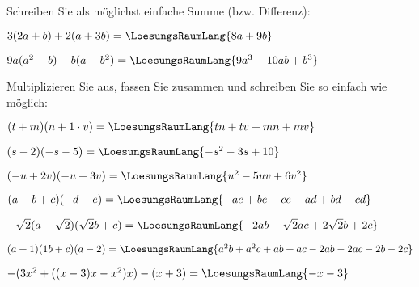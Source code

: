 
Schreiben Sie als möglichst einfache Summe (bzw. Differenz):
\begin{bbwAufgabenBlock}
\item $3(2a+b) + 2(a+3b)=\LoesungsRaumLang{8a+9b}$
\item $9a(a^2-b)-b(a-b^2) = \LoesungsRaumLang{9a^3 - 10ab + b^3}$
\end{bbwAufgabenBlock}
\newpage


Multiplizieren Sie aus, fassen Sie zusammen und schreiben Sie so
einfach wie möglich:
\begin{bbwAufgabenBlock}
\item $(t+m)(n+1\cdot{}v)=\LoesungsRaumLang{tn+tv+mn+mv}$
\item $(s-2)(-s-5) =\LoesungsRaumLang{-s^2-3s+10}$
\item $(-u+2v)(-u+3v) = \LoesungsRaumLang{u^2-5uv +6v^2}$
\item $(a-b+c)(-d-e)=\LoesungsRaumLang{-ae+be-ce-ad+bd-cd}$\newpage
\item $-\sqrt{2}(a-\sqrt{2})(\sqrt{2}b + c) =\LoesungsRaumLang{-2ab- \sqrt{2}ac + 2\sqrt{2}b +2c}$
\item $(a+1)(1b+c)(a-2) = \LoesungsRaumLang{a^2b+a^2c+ab+ac-2ab-2ac-2b-2c}$
\item $-(3x^2+((x-3)x-x^2)x)-(x+3) = \LoesungsRaumLang{-x-3}$
\end{bbwAufgabenBlock} 

\newpage




